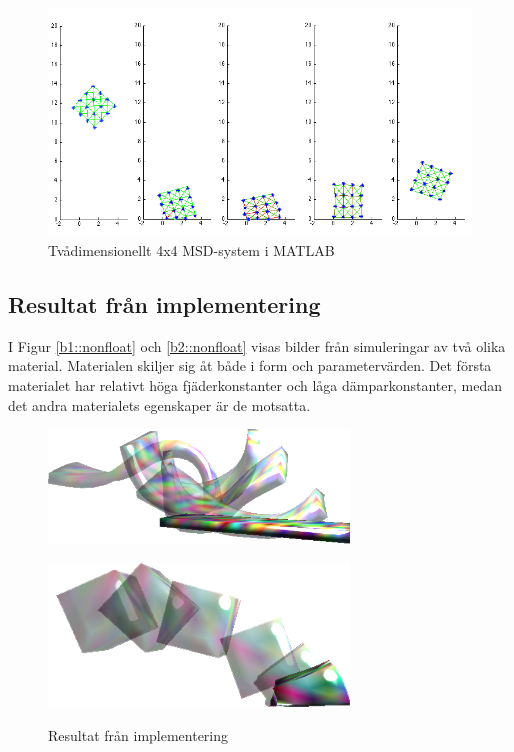\documentclass[a4paper,12pt,oneside,final,swedish]{extarticle}
\begin{document}
\begin{figure}[h!]
  \begin{center}
    \includegraphics[width=16cm]{Bilder/boing.png} 
  \end{center}
  \caption{Tvådimensionellt 4x4 MSD-system i MATLAB}
  \label{tvådim::nonfloat}
\end{figure}

\subsection{Resultat från implementering}
I Figur \ref{b1::nonfloat} och \ref{b2::nonfloat} visas bilder från simuleringar av två olika material. Materialen skiljer sig åt både i form och parametervärden. Det första materialet har relativt höga fjäderkonstanter och låga dämparkonstanter, medan det andra materialets egenskaper är de motsatta.
\begin{figure} [h] 
 \begin{minipage}[b]{.5\linewidth}
    \centering
    \includegraphics[width=8cm]{Bilder/Anim1.png} 
    \subcaption{}\label{b1::nonfloat}
  \end{minipage}
 \begin{minipage}[b]{.5\linewidth}
    \centering
    \includegraphics[width=8cm]{Bilder/Anim2.png} 
    \subcaption{}\label{b2::nonfloat}
  \end{minipage}
  \caption{Resultat från implementering}
  \label{res_imp::nonfloat}
\end{figure}
\end{document}
